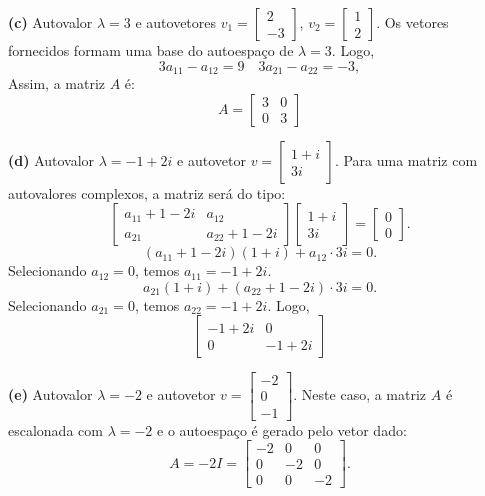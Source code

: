 \begin{resolution}
  {\bf (c)} Autovalor \( \lambda = 3 \) e autovetores \( v_1 = \begin{bmatrix} 2 \\ -3 \end{bmatrix} \), \( v_2 = \begin{bmatrix} 1 \\ 2 \end{bmatrix} \). Os vetores fornecidos formam uma base do autoespaço de \( \lambda = 3 \). Logo,
  \[
    3 a_{11}  - a_{12} = 9 \quad 3 a_{21} - a_{22}  = -3 ,
  \]
  Assim, a matriz \( A \) é:
  \begin{equation}
    A = \begin{bmatrix}
      3 & 0 \\ 0 & 3
    \end{bmatrix}
  \end{equation}

  {\bf (d)} Autovalor \( \lambda = -1 + 2i \) e autovetor \( v = \begin{bmatrix} 1 + i \\ 3i \end{bmatrix} \). Para uma matriz com autovalores complexos, a matriz será do tipo:
  \[
    \begin{bmatrix} a_{11} + 1 - 2i & a_{12} \\ a_{21} & a_{22} + 1 -2i \end{bmatrix} \begin{bmatrix}
      1 + i \\ 3i
    \end{bmatrix} = \begin{bmatrix}
      0 \\ 0
    \end{bmatrix}.
  \]
  \[
    (a_{11} + 1 - 2i)(1 + i) + a_{12} \cdot 3i = 0.
  \]
  Selecionando $a_{12} = 0$, temos $a_{11} = -1 + 2i$.
  \[
    a_{21}(1 + i) + (a_{22} + 1 - 2i) \cdot 3i = 0.
  \]
  Selecionando $a_{21}  = 0$, temos $a_{22} = -1 + 2i$.
  Logo,
  \begin{equation}
    \begin{bmatrix}
      -1 + 2i & 0       \\
      0       & -1 + 2i
    \end{bmatrix}
  \end{equation}

  {\bf (e)} Autovalor \( \lambda = -2 \) e autovetor \( v = \begin{bmatrix} -2 \\ 0 \\ -1 \end{bmatrix} \).
  Neste caso, a matriz \( A \) é escalonada com \( \lambda = -2 \) e o autoespaço é gerado pelo vetor dado:
  \[
    A = -2I = \begin{bmatrix} -2 & 0 & 0 \\ 0 & -2 & 0 \\ 0 & 0 & -2 \end{bmatrix}.
  \]
\end{resolution}

